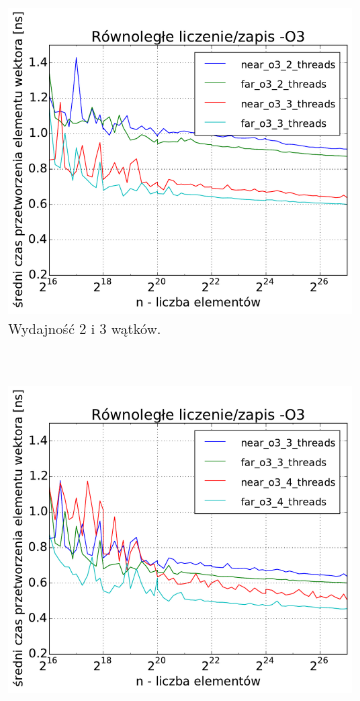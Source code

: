 \begin{figure}
    \centering
    \begin{subfigure}[c]{0.45\textwidth}
        \centering
        \includegraphics[width=\textwidth]{images/benchs/parallel_count_interesting1}
        \caption{Wydajność 2 i 3 wątków.}
    \end{subfigure}
    ~
    \begin{subfigure}[c]{0.45\textwidth}
        \centering
        \includegraphics[width=\textwidth]{images/benchs/parallel_count_interesting2}

\end{subfigure}
\end{figure}
